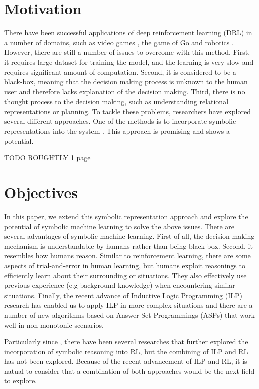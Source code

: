 \section{Motivation}

There have been successful applications of deep reinforcement learning (DRL) in a number of domains, 
such as video games \cite{Mnih2015}, the game of Go \cite{Silver2016} and robotics \cite{Levine2015}. 
However, there are still a number of issues to overcome with this method.
First, it requires large dataset for training the model, and the learning is very slow and requires significant amount of computation.
Second, it is considered to be a black-box, meaning that the decision making process is unknown to the human user and therefore lacks explanation of the decision making. 
Third, there is no thought process to the decision making, such as understanding relational representations or planning. To tackle these problems, researchers have explored several different approaches.
One of the methods is to incorporate symbolic representations into the system \cite{Garnelo2016}. This approach is promising and shows a potential.

TODO ROUGHTLY 1 page

\section{Objectives}

In this paper, we extend this symbolic representation approach and explore the potential of symbolic machine learning to solve the above issues. 
There are several advantages of symbolic machine learning. First of all, the decision making mechanism is understandable by humans rather than being black-box.
Second, it resembles how humans reason. Similar to reinforcement learning, there are some aspects of trial-and-error in human learning, but humans exploit reasonings to efficiently learn about their surrounding or situations. 
They also effectively use previous experience (e.g background knowledge) when encountering similar situations.
Finally, the recent advance of Inductive Logic Programming (ILP) research has enabled us to apply ILP in more complex situations and there are a number of new algorithms based on Answer Set Programmings (ASPs) that work well in non-monotonic scenarios.

Particularly since \cite{Garnelo2016}, there have been several researches that further explored the incorporation of symbolic reasoning into RL, but the combining of ILP and RL has not been explored. 
Because of the recent advancement of ILP and RL, it is natual to consider that a combination of both approaches would be the next field to explore.

